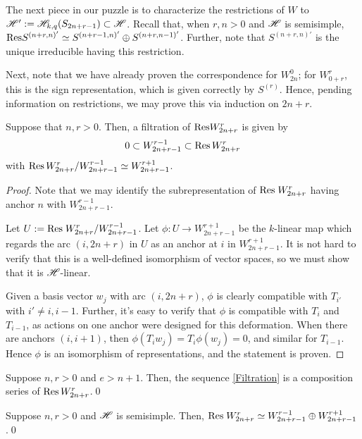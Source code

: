 \documentclass{amsart}
\begin{document}
The next piece in our puzzle is to characterize the restrictions of $W$ to $\mathscr{H}' := \mathscr{H}_{k,q}(S_{2n + r - 1}) \subset \mathscr{H}$.
Recall that, when $r,n>0$ and $\mathscr{H}$ is semisimple,  $\text{Res} S^{(n+r,n)'} \simeq S^{(n+r-1,n)'} \oplus S^{(n+r,n-1)'}$.
Further, note that $S^{(n+r,n)'}$ is the unique irreducible having this restriction.

Next, note that we have already proven the correspondence for $W_{2n}^0$;
for $W_{0 + r}^{r}$, this is the sign representation, which is given correctly by $S^{(r)}$.
Hence, pending information on restrictions, we may prove this via induction on $2n + r$.

\begin{proposition}
  Suppose that $n,r > 0$.
  Then, a filtration of $\text{Res} W_{2n + r}^r$ is given by
  \begin{equation}
    0 \subset W_{2n + r - 1}^{r-1} \subset \text{Res} \, W_{2n + r}^r \label{Filtration}
  \end{equation}
  with $\text{Res} \, W_{2n + r}^r / W_{2n + r - 1}^{r-1} \simeq W_{2n + r - 1}^{r + 1}$. 
\end{proposition}
\begin{proof}
  Note that we may identify the subrepresentation of $\text{Res} \; W_{2n + r}^r$ having anchor $n$ with $W_{2n + r - 1}^{r-1}$.
  
  Let $U := \text{Res} \; W_{2n + r}^r / W_{2n + r - 1}^{r - 1}$. 
  Let $\phi:U \rightarrow W_{2n + r - 1}^{r + 1}$ be the $k$-linear map which regards the arc $(i,2n + r)$ in $U$ as an anchor at $i$ in $W_{2n + r - 1}^{r + 1}$.
  It is not hard to verify that this is a well-defined isomorphism of vector spaces, so we must show that it is $\mathscr{H}$-linear.

  Given a basis vector $w_j$ with arc $(i,2n + r)$, $\phi$ is clearly compatible with $T_{i'}$ with $i' \neq i,i-1$.
  Further, it's easy to verify that $\phi$ is compatible with $T_{i}$ and $T_{i-1}$, as actions on one anchor were designed for this deformation.
  When there are anchors $(i,i+1)$, then $\phi(T_iw_j) = T_i\phi(w_j) = 0$, and similar for $T_{i -1}$.
  Hence $\phi$ is an isomorphism of representations, and the statement is proven.
\end{proof}

\begin{corollary}
  Suppose $n,r > 0$ and $e > n + 1$.
  Then, the sequence \eqref{Filtration} is a composition series of $\text{Res} \, W_{2n + r}^r$.\qed
\end{corollary}
\begin{corollary}
  Suppose $n,r > 0$ and $\mathscr{H}$ is semisimple.
  Then, $\text{Res} \; W_{2n + r}^r \simeq W_{2n + r - 1}^{r - 1} \oplus W_{2n + r - 1}^{r +1}$.\qed
\end{corollary}
\end{document}
